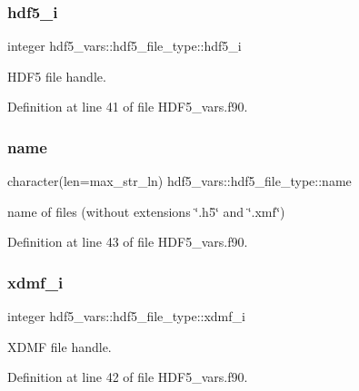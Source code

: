 \subsubsection{\texorpdfstring{hdf5\+\_\+i}{hdf5\_i}}
{\footnotesize\ttfamily integer hdf5\+\_\+vars\+::hdf5\+\_\+file\+\_\+type\+::hdf5\+\_\+i}



H\+D\+F5 file handle. 



Definition at line 41 of file H\+D\+F5\+\_\+vars.\+f90.

\mbox{\label{structhdf5__vars_1_1hdf5__file__type_a1739de1996623e79605d5000ffe97156}} 
\subsubsection{\texorpdfstring{name}{name}}
{\footnotesize\ttfamily character(len=max\+\_\+str\+\_\+ln) hdf5\+\_\+vars\+::hdf5\+\_\+file\+\_\+type\+::name}



name of files (without extensions \char`\"{}.\+h5\char`\"{} and \char`\"{}.\+xmf\char`\"{}) 



Definition at line 43 of file H\+D\+F5\+\_\+vars.\+f90.

\mbox{\label{structhdf5__vars_1_1hdf5__file__type_aceb5b42fcc6d848f1b0faaa9042b1a95}} 
\subsubsection{\texorpdfstring{xdmf\+\_\+i}{xdmf\_i}}
{\footnotesize\ttfamily integer hdf5\+\_\+vars\+::hdf5\+\_\+file\+\_\+type\+::xdmf\+\_\+i}



X\+D\+MF file handle. 



Definition at line 42 of file H\+D\+F5\+\_\+vars.\+f90.



